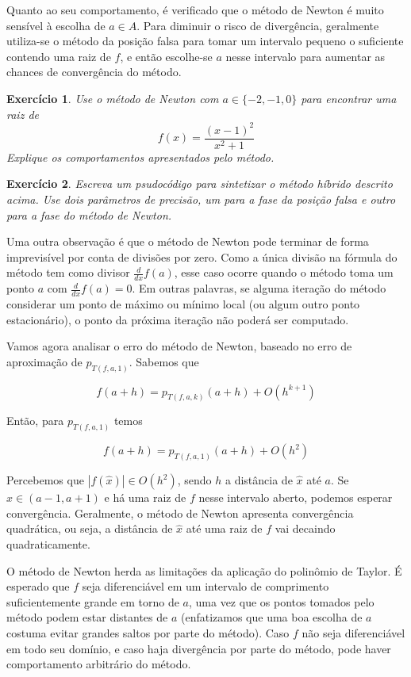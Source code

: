 \documentclass[]{article}
\newtheorem{exercicio}{Exercício}
\numberwithin{equation}{section}
\begin{document}
Quanto ao seu comportamento, é verificado que o método de Newton é muito sensível à escolha de $a \in A$. Para diminuir o risco de divergência, geralmente utiliza-se o método da posição falsa para tomar um intervalo pequeno o suficiente contendo uma raiz de $f$, e então escolhe-se $a$ nesse intervalo para aumentar as chances de convergência do método.

\begin{exercicio}
	Use o método de Newton com $a \in \{-2, -1, 0\}$ para encontrar uma raiz de $$f(x) = \frac{(x - 1)^2}{x^2 + 1}$$ Explique os comportamentos apresentados pelo método.
\end{exercicio}

\begin{exercicio}
	Escreva um psudocódigo para sintetizar o método híbrido descrito acima. Use dois parâmetros de precisão, um para a fase da posição falsa e outro para a fase do método de Newton.
\end{exercicio}

Uma outra observação é que o método de Newton pode terminar de forma imprevisível por conta de divisões por zero. Como a única divisão na fórmula do método tem como divisor $\frac{d}{dx} f(a)$, esse caso ocorre quando o método toma um ponto $a$ com $\frac{d}{dx} f(a) = 0$. Em outras palavras, se alguma iteração do método considerar um ponto de máximo ou mínimo local (ou algum outro ponto estacionário), o ponto da próxima iteração não poderá ser computado.

Vamos agora analisar o erro do método de Newton, baseado no erro de aproximação de $p_{T(f, a, 1)}$. Sabemos que

$$
f(a + h) = p_{T(f, a, k)}(a + h) + O(h^{k + 1})
$$

Então, para $p_{T(f, a, 1)}$ temos

$$
f(a + h) = p_{T(f, a, 1)}(a + h) + O(h^2)
$$

Percebemos que $|f(\hat{x})|\in O(h^2)$, sendo $h$ a distância de $\hat{x}$ até $a$. Se $\hat{x} \in (a - 1, a + 1)$ e há uma raiz de $f$ nesse intervalo aberto, podemos esperar convergência. Geralmente, o método de Newton apresenta convergência quadrática, ou seja, a distância de $\hat{x}$ até uma raiz de $f$ vai decaindo quadraticamente.

O método de Newton herda as limitações da aplicação do polinômio de Taylor. É esperado que $f$ seja diferenciável em um intervalo de comprimento suficientemente grande em torno de $a$, uma vez que os pontos tomados pelo método podem estar distantes de $a$ (enfatizamos que uma boa escolha de $a$ costuma evitar grandes saltos por parte do método). Caso $f$ não seja diferenciável em todo seu domínio, e caso haja divergência por parte do método, pode haver comportamento arbitrário do método.
\end{document}
